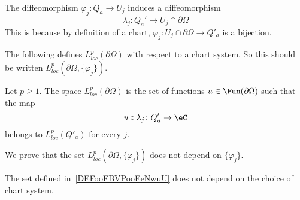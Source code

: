 The diffeomorphism \( \varphi_j\colon Q_a\to U_j\) induces a diffeomorphism
\begin{equation}
 \lambda_j\colon Q_a'\to U_j\cap\partial \Omega
\end{equation}
This is because by definition of a chart, \( \varphi_j\colon U_j\cap\partial\Omega\to Q'_a\) is a bijection.

The following defines \( L^p_{loc}(\partial\Omega)\) with respect to a chart system. So this should be written \( L^p_{loc}(\partial\Omega,\{ \varphi_j \})\).
\begin{definition}      \label{DEFooFBVPooEeNwuU}
    Let \( p\geq 1\). The space \( L^p_{loc}(\partial \Omega)\) is the set of functions \( u\in\Fun(\partial\Omega)\) such that the map
    \begin{equation}
        u\circ\lambda_j\colon Q'_a\to \eC
    \end{equation}
    belongs to \( L^p_{loc}(Q'_a)\) for every \( j\).
\end{definition}

We prove that the set \( L^p_{loc}(\partial\Omega,\{ \varphi_j \})\) does not depend on \( \{ \varphi_j \}\).
\begin{lemma}
    The set defined in~\ref{DEFooFBVPooEeNwuU} does not depend on the choice of chart system.
\end{lemma}

